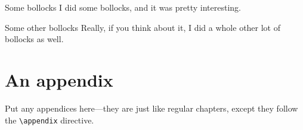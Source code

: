 \documentclass[oneside,11pt,xetex]{scrbook}
\begin{document}
\begin{onehalfspace}
\begin{headinglist}
\item[Some bollocks]
  I did some bollocks, and it was pretty interesting.
\item[Some other bollocks] 
  Really, if you think about it, I did a whole other lot of bollocks
  as well.
\end{headinglist}


\appendix

\chapter{An appendix}
\label{chap:an-appendix}

Put any appendices here---they are just like regular chapters, except
they follow the \texttt{\textbackslash{}appendix} directive.

\end{onehalfspace}

\backmatter


\printbibliography[title=References,heading=bibintoc]

\listoffigures

\listoftables
\end{document}

